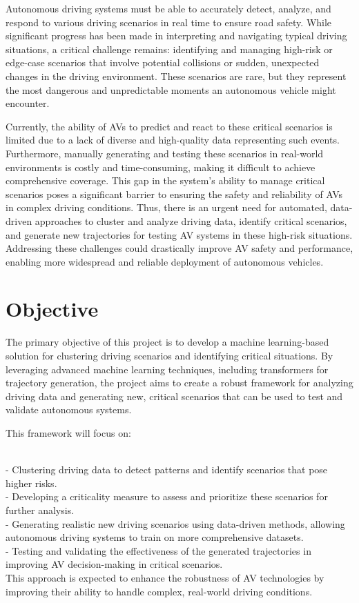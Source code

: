 \documentclass[12pt,a4paper]{report}
\begin{document}
Autonomous driving systems must be able to accurately detect, analyze, and respond to various driving scenarios in real time to ensure road safety. While significant progress has been made in interpreting and navigating typical driving situations, a critical challenge remains: identifying and managing high-risk or edge-case scenarios that involve potential collisions or sudden, unexpected changes in the driving environment. These scenarios are rare, but they represent the most dangerous and unpredictable moments an autonomous vehicle might encounter.

Currently, the ability of AVs to predict and react to these critical scenarios is limited due to a lack of diverse and high-quality data representing such events. Furthermore, manually generating and testing these scenarios in real-world environments is costly and time-consuming, making it difficult to achieve comprehensive coverage. This gap in the system's ability to manage critical scenarios poses a significant barrier to ensuring the safety and reliability of AVs in complex driving conditions. Thus, there is an urgent need for automated, data-driven approaches to cluster and analyze driving data, identify critical scenarios, and generate new trajectories for testing AV systems in these high-risk situations. Addressing these challenges could drastically improve AV safety and performance, enabling more widespread and reliable deployment of autonomous vehicles.


\section{Objective}

The primary objective of this project is to develop a machine learning-based solution for clustering driving scenarios and identifying critical situations. By leveraging advanced machine learning techniques, including transformers for trajectory generation, the project aims to create a robust framework for analyzing driving data and generating new, critical scenarios that can be used to test and validate autonomous systems.

This framework will focus on:

\\ - Clustering driving data to detect patterns and identify scenarios that pose higher risks.
\\ - Developing a criticality measure to assess and prioritize these scenarios for further analysis.
\\ - Generating realistic new driving scenarios using data-driven methods, allowing autonomous driving systems to train on more comprehensive datasets.
\\ - Testing and validating the effectiveness of the generated trajectories in improving AV decision-making in critical scenarios.
\\ This approach is expected to enhance the robustness of AV technologies by improving their ability to handle complex, real-world driving conditions.
\end{document}
